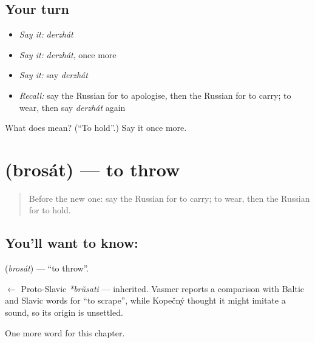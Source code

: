 \subsection*{Your turn}
\begin{itemize}
\raggedright
  \item \emph{Say it:} \emph{derzhát}
  \item \emph{Say it:} \emph{derzhát}, once more
  \item \emph{Say it:} say \emph{derzhát}
  \item \emph{Recall:} say the Russian for to apologise, then the Russian for to carry; to wear, then say \emph{derzhát} again
\end{itemize}

\begin{tcolorbox}[breakable,colback=teal!4,colframe=teal!35!black,title={Before you move on}]
What does  mean? (\textquotedblleft{}To hold\textquotedblright{}.) Say it once more.
\end{tcolorbox}
\section[\texorpdfstring{\ru{бросать} (brosát)}{бросать (brosát)}]{ (brosát) — to throw}

\label{lesson:RU-C142-brosat}



\begin{quote}
Before the new one: say the Russian for to carry; to wear, then the Russian for to hold.
\end{quote}

\subsection*{You'll want to know: }
\textbf{} (\emph{brosát}) — \textquotedblleft{}to throw\textquotedblright{}.

\begin{cousinweb}
\textbf{} $\leftarrow$ Proto-Slavic \emph{*brŭsati} — inherited. Vasmer reports a comparison with Baltic and Slavic words for \textquotedblleft{}to scrape\textquotedblright{}, while Kopečný thought it might imitate a sound, so its origin is unsettled.
\end{cousinweb}

\begin{grammarlens}[title={What you've built}]
One more word for this chapter.
\end{grammarlens}

